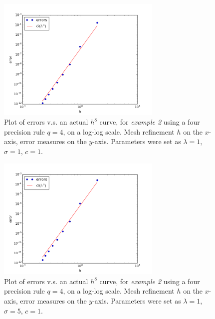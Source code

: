 \documentclass{uonmathreport}
\begin{document}
\begin{figure}[H]
	\begin{center}
		\includegraphics[width=0.7\textwidth]{Figures/2dRectTest2_q=4_case1.png}
	\end{center}
	\caption{Plot of errors v.s. an actual $h^8$ curve, for \textit{example 2} using a four precision rule $q=4$, on a log-log scale. Mesh refinement $h$ on the $x$-axis, error measures on the $y$-axis. Parameters were set as $\lambda=1$, $\sigma=1$, $c=1$.}
	\label{fig:2dErrors_test2_q4_case1}
\end{figure}

\begin{figure}[H]
	\begin{center}
		\includegraphics[width=0.7\textwidth]{Figures/2dRectTest2_q=4_case2.png}
	\end{center}
	\caption{Plot of errors v.s. an actual $h^8$ curve, for \textit{example 2} using a four precision rule $q=4$, on a log-log scale. Mesh refinement $h$ on the $x$-axis, error measures on the $y$-axis. Parameters were set as $\lambda=1$, $\sigma=5$, $c=1$.}
	\label{fig:2dErrors_test2_q4_case2}
\end{figure}
\end{document}
